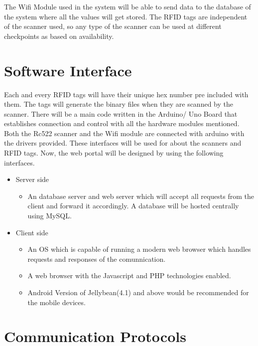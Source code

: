 \documentclass{scrreprt}
\begin{document}
The Wifi Module used in the system will be able to send data to the database of the system where all the values will get stored. The RFID tags are independent of the scanner used, so any type of the scanner can be used at different checkpoints as based on availability.

\section{Software Interface}

Each and every RFID tags will have their unique hex number pre included with them. The tags will generate the binary files when they are scanned by the scanner. There will be a main code written in the Arduino/ Uno Board that establishes connection and control with all the hardware modules mentioned. Both the Rc522 scanner and the Wifi module are connected with arduino with the drivers provided. These interfaces will be used for about the scanners and RFID tags. Now, the web portal will be designed by using the following interfaces.

 
 \begin{itemize}
 \item { Server side}
 \begin{itemize}
    
 
 \item An database server and web server which will accept all requests from the client and forward it accordingly. A database will be hosted centrally using MySQL.
 \end{itemize}


\item {Client side} 


\begin{itemize}
\item An OS which is capable of running a modern web browser which handles requests and responses of the comunnication.

\item A web browser with the Javascript and PHP technologies enabled.
\item  Android Version of Jellybean(4.1) and above would be recommended for the mobile devices. \newline 



\end{itemize}
\end{itemize}

\section{Communication Protocols}
\end{document}
